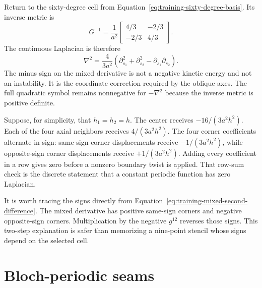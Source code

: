 Return to the sixty-degree cell from
Equation~\eqref{eq:training-sixty-degree-basis}. Its inverse metric is
\begin{equation}
  G^{-1}=\frac{1}{a^2}
  \begin{bmatrix}
    4/3 & -2/3\\
    -2/3 & 4/3
  \end{bmatrix}.
\end{equation}
The continuous Laplacian is therefore
\begin{equation}
  \nabla^2
  =\frac{4}{3a^2}
  \left(
    \partial_{s_1}^2
    +\partial_{s_2}^2
    -\partial_{s_1}\partial_{s_2}
  \right).
  \label{eq:training-sixty-degree-laplacian}
\end{equation}
The minus sign on the mixed derivative is not a negative kinetic energy and not
an instability. It is the coordinate correction required by the oblique axes.
The full quadratic symbol remains nonnegative for $-\nabla^2$ because the
inverse metric is positive definite.

Suppose, for simplicity, that $h_1=h_2=h$. The center receives
$-16/(3a^2h^2)$. Each of the four axial neighbors receives
$4/(3a^2h^2)$. The four corner coefficients alternate in sign: same-sign
corner displacements receive $-1/(3a^2h^2)$, while opposite-sign corner
displacements receive $+1/(3a^2h^2)$. Adding every coefficient in a row gives
zero before a nonzero boundary twist is applied. That row-sum check is the
discrete statement that a constant periodic function has zero Laplacian.

It is worth tracing the signs directly from
Equation~\eqref{eq:training-mixed-second-difference}. The mixed derivative has
positive same-sign corners and negative opposite-sign corners. Multiplication
by the negative $g^{12}$ reverses those signs. This two-step explanation is
safer than memorizing a nine-point stencil whose signs depend on the selected
cell.

\section{Bloch-periodic seams}

